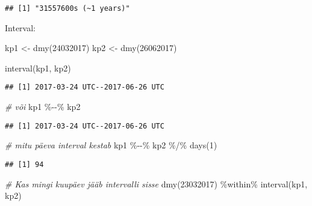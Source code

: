 \documentclass[
]{book}
\newenvironment{Shaded}{\begin{snugshade}}{\end{snugshade}}
\newcommand{\CommentTok}[1]{\textcolor[rgb]{0.56,0.35,0.01}{\textit{#1}}}
\newcommand{\DecValTok}[1]{\textcolor[rgb]{0.00,0.00,0.81}{#1}}
\newcommand{\FunctionTok}[1]{\textcolor[rgb]{0.00,0.00,0.00}{#1}}
\newcommand{\NormalTok}[1]{#1}
\newcommand{\OtherTok}[1]{\textcolor[rgb]{0.56,0.35,0.01}{#1}}
\newcommand{\SpecialCharTok}[1]{\textcolor[rgb]{0.00,0.00,0.00}{#1}}
\begin{document}
\begin{verbatim}
## [1] "31557600s (~1 years)"
\end{verbatim}

Interval:

\begin{Shaded}
\begin{Highlighting}[]
\NormalTok{kp1 }\OtherTok{\textless{}{-}} \FunctionTok{dmy}\NormalTok{(}\DecValTok{24032017}\NormalTok{)}
\NormalTok{kp2 }\OtherTok{\textless{}{-}} \FunctionTok{dmy}\NormalTok{(}\DecValTok{26062017}\NormalTok{)}

\FunctionTok{interval}\NormalTok{(kp1, kp2)}
\end{Highlighting}
\end{Shaded}

\begin{verbatim}
## [1] 2017-03-24 UTC--2017-06-26 UTC
\end{verbatim}

\begin{Shaded}
\begin{Highlighting}[]
\CommentTok{\# või}
\NormalTok{kp1 }\SpecialCharTok{\%{-}{-}\%}\NormalTok{ kp2}
\end{Highlighting}
\end{Shaded}

\begin{verbatim}
## [1] 2017-03-24 UTC--2017-06-26 UTC
\end{verbatim}

\begin{Shaded}
\begin{Highlighting}[]
\CommentTok{\# mitu päeva interval kestab}
\NormalTok{kp1 }\SpecialCharTok{\%{-}{-}\%}\NormalTok{ kp2 }\SpecialCharTok{\%/\%} \FunctionTok{days}\NormalTok{(}\DecValTok{1}\NormalTok{)}
\end{Highlighting}
\end{Shaded}

\begin{verbatim}
## [1] 94
\end{verbatim}

\begin{Shaded}
\begin{Highlighting}[]
\CommentTok{\# Kas mingi kuupäev jääb intervalli sisse}
\FunctionTok{dmy}\NormalTok{(}\DecValTok{23032017}\NormalTok{) }\SpecialCharTok{\%within\%} \FunctionTok{interval}\NormalTok{(kp1, kp2)}
\end{Highlighting}
\end{Shaded}
\end{document}
